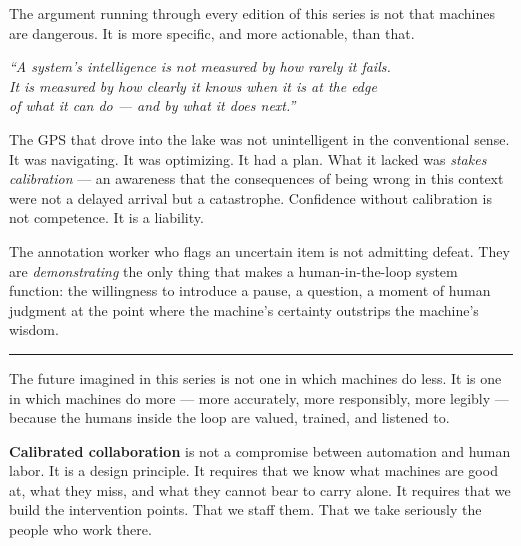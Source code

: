 \documentclass[12pt, a4paper]{article}
\begin{document}
\vspace{0.8cm}

The argument running through every edition of this series is not that machines are dangerous. It is more specific, and more actionable, than that.

\vspace{10pt}

\begin{tcolorbox}[
  enhanced,
  colback=charcoal,
  colframe=charcoal,
  arc=5pt,
  boxrule=0pt,
  left=20pt, right=20pt,
  top=20pt, bottom=20pt,
]
\begin{center}
\large\color{white}\itshape
``A system's intelligence is not measured by how rarely it fails.\\[4pt]
It is measured by how clearly it knows when it is at the edge\\[4pt]
of what it can do — and by what it does next.''
\end{center}
\end{tcolorbox}

\vspace{14pt}

The GPS that drove into the lake was not unintelligent in the conventional sense. It was navigating. It was optimizing. It had a plan. What it lacked was \textit{stakes calibration} — an awareness that the consequences of being wrong in this context were not a delayed arrival but a catastrophe. Confidence without calibration is not competence. It is a liability.

The annotation worker who flags an uncertain item is not admitting defeat. They are \textit{demonstrating} the only thing that makes a human-in-the-loop system function: the willingness to introduce a pause, a question, a moment of human judgment at the point where the machine's certainty outstrips the machine's wisdom.

\vspace{12pt}

\begin{center}
\color{amber}\rule{4cm}{0.6pt}
\end{center}

\vspace{12pt}

The future imagined in this series is not one in which machines do less. It is one in which machines do more — more accurately, more responsibly, more legibly — because the humans inside the loop are valued, trained, and listened to.

\textbf{Calibrated collaboration} is not a compromise between automation and human labor. It is a design principle. It requires that we know what machines are good at, what they miss, and what they cannot bear to carry alone. It requires that we build the intervention points. That we staff them. That we take seriously the people who work there.
\end{document}
